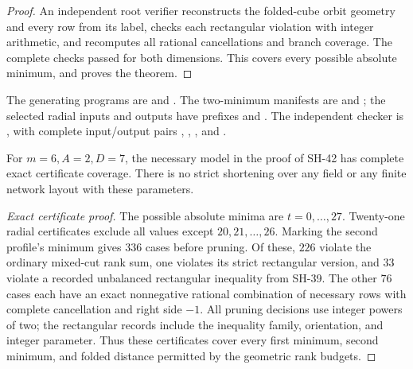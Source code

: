 \begin{proof}
An independent root verifier reconstructs the
folded-cube orbit geometry and every row from
its label, checks each rectangular violation
with integer arithmetic, and recomputes all
rational cancellations and branch coverage.
The complete checks passed for both dimensions.
This covers every possible absolute minimum,
and proves the theorem.
\end{proof}

The generating programs are
and .
The two-minimum manifests are
and ;
the selected radial inputs and outputs have prefixes
 and
.
The independent checker is
,
with complete input/output pairs
,
,
, and
.

\begin{theorem}
\label{prop:width-six-dimension-seven-certificates}
For $m=6,A=2,D=7$, the necessary model in the proof
of SH-42 has complete exact certificate coverage.
There is no strict shortening over any field or
any finite network layout with these parameters.
\end{theorem}

\begin{proof}[Exact certificate proof]
The possible absolute minima are $t=0,\ldots,27$.
Twenty-one radial certificates exclude all values
except $20,21,\ldots,26$.  Marking the second
profile's minimum gives $336$ cases before pruning.
Of these, $226$ violate the ordinary mixed-cut
rank sum, one violates its strict rectangular
version, and $33$ violate a recorded unbalanced
rectangular inequality from SH-39.  The other
$76$ cases each have an exact nonnegative rational
combination of necessary rows with complete
cancellation and right side $-1$.
All pruning decisions use integer powers of two;
the rectangular records include the inequality
family, orientation, and integer parameter.
Thus these certificates cover every first minimum,
second minimum, and folded distance permitted by
the geometric rank budgets.
\end{proof}

